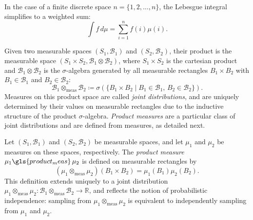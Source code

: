 In the case of a finite discrete space $n = \{1, 2, \dots, n\}$, the Lebesgue integral simplifies to a weighted sum:
$$
\int f \, d\mu = \sum_{i=1}^n f(i) \mu(i).
$$

Given two measurable spaces $(S_1, \mathcal{B}_1)$ and $(S_2, \mathcal{B}_2)$, their product is the measurable space $(S_1 \times S_2, \mathcal{B}_1 \otimes \mathcal{B}_2)$, where $S_1  \times S_2$ is the cartesian product and $\mathcal{B}_1 \otimes \mathcal{B}_2$ is the $\sigma$-algebra generated by all measurable rectangles $B_1 \times B_2$ with $B_1 \in \mathcal{B}_1$ and $B_2 \in \mathcal{B}_2$:
$$
\mathcal{B}_1 \otimes_{\text{meas}} \mathcal{B}_2 \coloneqq \sigma\left(\{ B_1 \times B_2 \mid B_1 \in \mathcal{B}_1,\, B_2 \in \mathcal{B}_2 \}\right).
$$
Measures on this product space are called \emph{joint distributions}, and are uniquely determined by their values on measurable rectangles due to the inductive structure of the product $\sigma$-algebra. \emph{Product measures} are a particular class of joint distributions and are defined from measures, as detailed next.

\begin{definition} 
   Let $(S_1, \mathcal{B}_1)$ and $(S_2, \mathcal{B}_2)$ be measurable spaces, and let $\mu_1$ and $\mu_2$ be measures on these spaces, respectively. The \emph{product measure} $\mu_1 \gls{product_meas} \, \mu_2$ is  defined on measurable rectangles by
$$
(\mu_1 \otimes_{\text{meas}} \mu_2)(B_1 \times B_2) = \mu_1(B_1)\mu_2(B_2).
$$
This definition extends uniquely to a joint distribution $\mu_1 \otimes_{\text{meas}} \mu_2: \mathcal{B}_1 \otimes_{\text{meas}} \mathcal{B}_2 \to \mathbb{R}$, and reflects the notion of probabilistic independence: sampling from $\mu_1 \otimes_{\text{meas}} \mu_2$ is equivalent to independently sampling from $\mu_1$ and $\mu_2$.
\end{definition}

